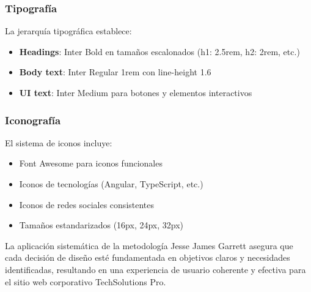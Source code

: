\subsubsection{Tipografía}
La jerarquía tipográfica establece:

\begin{itemize}
    \item \textbf{Headings}: Inter Bold en tamaños escalonados (h1: 2.5rem, h2: 2rem, etc.)
    \item \textbf{Body text}: Inter Regular 1rem con line-height 1.6
    \item \textbf{UI text}: Inter Medium para botones y elementos interactivos
\end{itemize}

\subsubsection{Iconografía}
El sistema de iconos incluye:

\begin{itemize}
    \item Font Awesome para iconos funcionales
    \item Iconos de tecnologías (Angular, TypeScript, etc.)
    \item Iconos de redes sociales consistentes
    \item Tamaños estandarizados (16px, 24px, 32px)
\end{itemize}

La aplicación sistemática de la metodología Jesse James Garrett asegura que cada decisión de diseño esté fundamentada en objetivos claros y necesidades identificadas, resultando en una experiencia de usuario coherente y efectiva para el sitio web corporativo TechSolutions Pro.
